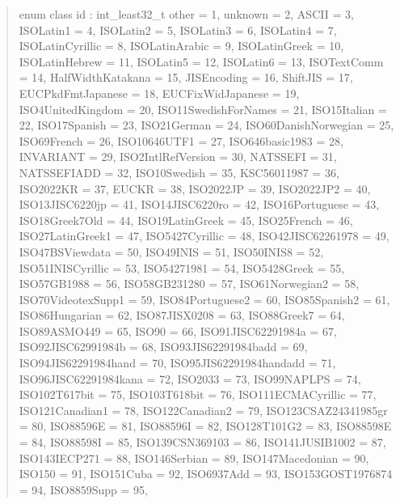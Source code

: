 \documentclass{wg21}
\begin{document}
\begin{quote}
\begin{addedblock}
\begin{codeblock}
{{    enum class id : int_least32_t {
        other = 1,
        unknown = 2,
        ASCII = 3,
        ISOLatin1 = 4,
        ISOLatin2 = 5,
        ISOLatin3 = 6,
        ISOLatin4 = 7,
        ISOLatinCyrillic = 8,
        ISOLatinArabic = 9,
        ISOLatinGreek = 10,
        ISOLatinHebrew = 11,
        ISOLatin5 = 12,
        ISOLatin6 = 13,
        ISOTextComm = 14,
        HalfWidthKatakana = 15,
        JISEncoding = 16,
        ShiftJIS = 17,
        EUCPkdFmtJapanese = 18,
        EUCFixWidJapanese = 19,
        ISO4UnitedKingdom = 20,
        ISO11SwedishForNames = 21,
        ISO15Italian = 22,
        ISO17Spanish = 23,
        ISO21German = 24,
        ISO60DanishNorwegian = 25,
        ISO69French = 26,
        ISO10646UTF1 = 27,
        ISO646basic1983 = 28,
        INVARIANT = 29,
        ISO2IntlRefVersion = 30,
        NATSSEFI = 31,
        NATSSEFIADD = 32,
        ISO10Swedish = 35,
        KSC56011987 = 36,
        ISO2022KR = 37,
        EUCKR = 38,
        ISO2022JP = 39,
        ISO2022JP2 = 40,
        ISO13JISC6220jp = 41,
        ISO14JISC6220ro = 42,
        ISO16Portuguese = 43,
        ISO18Greek7Old = 44,
        ISO19LatinGreek = 45,
        ISO25French = 46,
        ISO27LatinGreek1 = 47,
        ISO5427Cyrillic = 48,
        ISO42JISC62261978 = 49,
        ISO47BSViewdata = 50,
        ISO49INIS = 51,
        ISO50INIS8 = 52,
        ISO51INISCyrillic = 53,
        ISO54271981 = 54,
        ISO5428Greek = 55,
        ISO57GB1988 = 56,
        ISO58GB231280 = 57,
        ISO61Norwegian2 = 58,
        ISO70VideotexSupp1 = 59,
        ISO84Portuguese2 = 60,
        ISO85Spanish2 = 61,
        ISO86Hungarian = 62,
        ISO87JISX0208 = 63,
        ISO88Greek7 = 64,
        ISO89ASMO449 = 65,
        ISO90 = 66,
        ISO91JISC62291984a = 67,
        ISO92JISC62991984b = 68,
        ISO93JIS62291984badd = 69,
        ISO94JIS62291984hand = 70,
        ISO95JIS62291984handadd = 71,
        ISO96JISC62291984kana = 72,
        ISO2033 = 73,
        ISO99NAPLPS = 74,
        ISO102T617bit = 75,
        ISO103T618bit = 76,
        ISO111ECMACyrillic = 77,
        ISO121Canadian1 = 78,
        ISO122Canadian2 = 79,
        ISO123CSAZ24341985gr = 80,
        ISO88596E = 81,
        ISO88596I = 82,
        ISO128T101G2 = 83,
        ISO88598E = 84,
        ISO88598I = 85,
        ISO139CSN369103 = 86,
        ISO141JUSIB1002 = 87,
        ISO143IECP271 = 88,
        ISO146Serbian = 89,
        ISO147Macedonian = 90,
        ISO150 = 91,
        ISO151Cuba = 92,
        ISO6937Add = 93,
        ISO153GOST1976874 = 94,
        ISO8859Supp = 95,
}}}
\end{codeblock}
\end{addedblock}
\end{quote}
\end{document}
